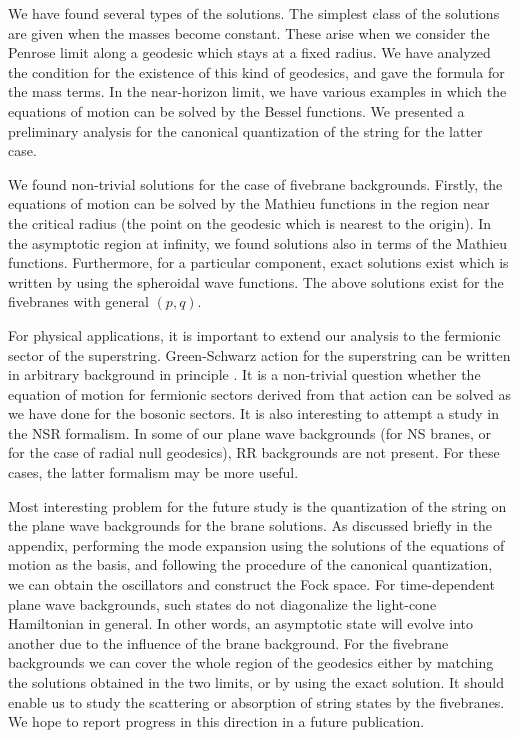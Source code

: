 \documentclass[a4paper,12pt]{article}
\begin{document}
We have found several types of the solutions. 
The simplest class of the solutions are given when
the masses become constant. These arise 
when we consider the Penrose limit along a geodesic 
which stays at a fixed radius. We have analyzed the 
condition for the existence of this kind of geodesics,
and gave the formula for the mass terms.
In the near-horizon limit, we have various examples
in which the equations of motion can be solved 
by the Bessel functions. We presented a preliminary
analysis for the canonical quantization of the string
for the latter case.

We found non-trivial solutions for the case
of fivebrane backgrounds. Firstly, 
the equations of motion can be solved by the 
Mathieu functions in the region near the 
critical radius (the point on the geodesic 
which is nearest to the origin). 
In the asymptotic region at infinity,
we found solutions also in terms of the Mathieu
functions. Furthermore, for a particular component,
exact solutions exist which is written by using
the spheroidal wave functions. The above solutions
exist for the fivebranes with general $(p,q)$.

For physical applications, it is important to extend
our analysis to the fermionic sector of the superstring.
Green-Schwarz action for the superstring can be written in 
arbitrary background in principle \cite{Gr}.
It is a non-trivial question whether the equation of
motion for fermionic sectors derived from that action
can be solved as we have done for the bosonic sectors.
It is also interesting to attempt a study in the NSR
formalism. In some of our plane wave backgrounds (for NS branes,
or for the case of radial null geodesics), RR backgrounds
are not present. For these cases, the latter formalism
may be more useful.

Most interesting problem for the future study is the 
quantization of the string on the plane wave backgrounds
for the brane solutions. As discussed briefly in the appendix,
performing the mode expansion using the solutions of 
the equations of motion as the  basis, and following 
the procedure of the canonical quantization,
we can obtain the oscillators and construct the Fock space. 
For time-dependent plane wave backgrounds, such states 
do not diagonalize the light-cone Hamiltonian in general. 
In other words, an asymptotic state will evolve into another due
to the influence of the brane background.
For the fivebrane backgrounds we can cover
the whole region of the geodesics either by matching the
solutions obtained in the two limits, or by using 
the exact solution. It should enable us to study the 
scattering or absorption of string states by the fivebranes.
We hope to report progress in this direction
in a future publication.
\end{document}
